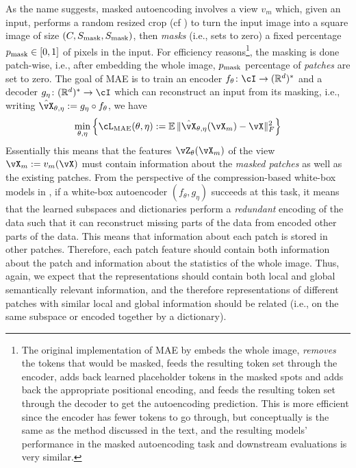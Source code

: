 \documentclass[\toplevelprefix/book-main.tex]{subfiles}
\begin{document}
As the name suggests, masked autoencoding involves a view \(v_{m}\) which, given an input, performs a random resized crop (cf ) to turn the input image into a square image of size \((C, S_{\mathrm{mask}}, S_{\mathrm{mask}})\), then \textit{masks} (i.e., sets to zero) a fixed percentage \(p_{\mathrm{mask}} \in [0, 1]\) of pixels in the input. For efficiency reasons\footnote{The original implementation of MAE by \cite{he2022masked} embeds the whole image, \textit{removes} the tokens that would be masked, feeds the resulting token set through the encoder, adds back learned placeholder tokens in the masked spots and adds back the appropriate positional encoding, and feeds the resulting token set through the decoder to get the autoencoding prediction. This is more efficient since the encoder has fewer tokens to go through, but conceptually is the same as the method discussed in the text, and the resulting models' performance in the masked autoencoding task and downstream evaluations is very similar.}, the masking is done patch-wise, i.e.,  after embedding the whole image, \(p_{\mathrm{mask}}\) percentage of \textit{patches} are set to zero. The goal of MAE is to train an encoder \(f_{\theta} \colon \cI \to (\R^{d})^{*}\) and a decoder \(g_{\eta} \colon (\R^{d})^{*} \to \cI\) which can reconstruct an input from its masking, i.e., writing \(\hat{\vX}_{\theta, \eta} := g_{\eta} \circ f_{\theta}\), we have
\begin{equation}
    \min_{\theta, \eta}\bc{\cL_{\mathrm{MAE}}(\theta, \eta) := \Ex\norm{\hat{\vX}_{\theta, \eta}(\vX_{m}) - \vX}_{F}^{2}}
\end{equation}
Essentially this means that the features \(\vZ_{\theta}(\vX_{m})\) of the view \(\vX_{m} := v_{m}(\vX)\) must contain information about the \textit{masked patches} as well as the existing patches. From the perspective of the compression-based white-box models in , if a white-box autoencoder  \((f_{\theta}, g_{\eta})\) succeeds at this task, it means that the learned subspaces and dictionaries perform a \textit{redundant} encoding of the data such that it can reconstruct missing parts of the data from encoded other parts of the data. This means that information about each patch is stored in other patches. Therefore, each patch feature should contain both information about the patch and information about the statistics of the whole image. Thus, again, we expect that the representations should contain both local and global semantically relevant information, and the therefore representations of different patches with similar local and global information should be related (i.e., on the same subspace or encoded together by a dictionary).
\end{document}

